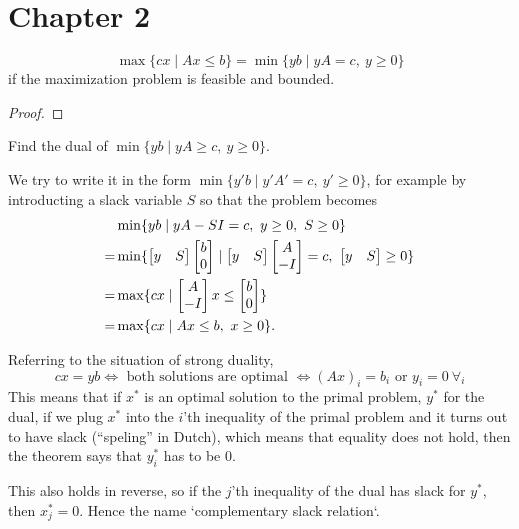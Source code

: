 \documentclass{exam}
\begin{document}
    \section{Chapter 2}\label{sec:chapter2}
    \begin{theorem}
        \[
            \max \{ cx \mid Ax \le b \} = \min \{ yb \mid yA=c,\ y \ge 0 \}
        \]
        if the maximization problem is feasible and bounded.
    \end{theorem}
    \begin{proof}
    \end{proof}
    \begin{question}
        Find the dual of $\min \{ yb \mid yA \ge c,\ y \ge 0 \}$.
    \end{question}
    \begin{answer}
        We try to write it in the form $\min \{ y'b \mid y'A'=c,\ y'\ge0 \}$, for example by introducting a slack variable $S$ so that the problem becomes
        \begin{align*}
            &\min \{ yb \mid yA -SI=c,\ y \ge 0,\ S \ge 0 \} \\
            =&\min \{ \matrix{y & S} \matrix{b \\ 0} \mid \matrix{y & S} \matrix{A \\ -I} = c,\ \matrix{y & S} \ge 0 \} \\
            =&\max \{ cx \mid \matrix{A \\ -I} x \le \matrix{b \\ 0} \} \\
            =&\max \{ cx \mid Ax\le b,\ x \ge 0 \}.
        \end{align*}
    \end{answer}
    \begin{theorem}
        Referring to the situation of strong duality,
        \[
            cx = yb \iff \text{ both solutions are optimal } \iff (Ax)_i = b_i \text{ or } y_i = 0\ \forall_i
        \]
        This means that if $x^*$ is an optimal solution to the primal problem, $y^*$ for the dual, if we plug $x^*$ into the $i$'th inequality of the primal problem and it turns out to have slack (``speling'' in Dutch), which means that equality does not hold, then the theorem says that $y_i^*$ has to be 0.

        This also holds in reverse, so if the $j$'th inequality of the dual has slack for $y^*$, then $x_j^* = 0$.
        Hence the name `complementary slack relation`.
    \end{theorem}
\end{document}

